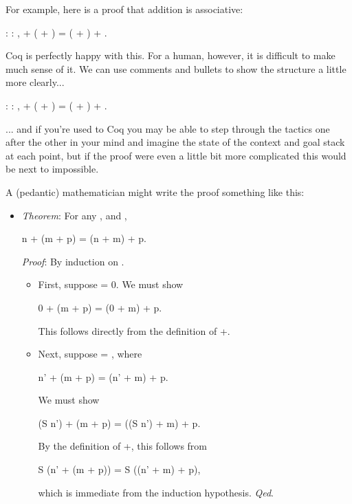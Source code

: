 \documentclass[12pt]{report}
\begin{document}
 For example, here is a proof that addition is associative: \begin{coqdoccode}
\coqdocemptyline
\coqdocnoindent
{}  : \coqdockw{\ensuremath{\forall}}    : ,\coqdoceol
\coqdocindent{1.00em}
 + ( + ) = ( + ) + .\coqdoceol
 \coqdocemptyline
\end{coqdoccode}
Coq is perfectly happy with this.  For a human, however, it
    is difficult to make much sense of it.  We can use comments and
    bullets to show the structure a little more clearly... \begin{coqdoccode}
\coqdocemptyline
\coqdocnoindent
{}  : \coqdockw{\ensuremath{\forall}}    : ,\coqdoceol
\coqdocindent{1.00em}
 + ( + ) = ( + ) + .\coqdoceol
\coqdocemptyline
\end{coqdoccode}
... and if you're used to Coq you may be able to step
    through the tactics one after the other in your mind and imagine
    the state of the context and goal stack at each point, but if the
    proof were even a little bit more complicated this would be next
    to impossible.


    A (pedantic) mathematician might write the proof something like
    this: 


\begin{itemize}
\item  \textit{Theorem}: For any ,  and ,


      n + (m + p) = (n + m) + p.


    \textit{Proof}: By induction on .



\begin{itemize}
\item  First, suppose  = 0.  We must show


        0 + (m + p) = (0 + m) + p.


      This follows directly from the definition of +.



\item  Next, suppose  =  , where


        n' + (m + p) = (n' + m) + p.


      We must show


        (S n') + (m + p) = ((S n') + m) + p.


      By the definition of +, this follows from


        S (n' + (m + p)) = S ((n' + m) + p),


      which is immediate from the induction hypothesis.  \textit{Qed}. 
\end{itemize}

\end{itemize}
\end{document}
